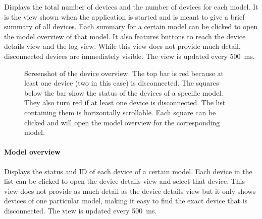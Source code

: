 Displays the total number of devices and the number of devices for each model. It is the view shown
when the application is started and is meant to give a brief summary of all devices. Each summary
for a certain model can be clicked to open the model overview of that model. It also features buttons
to reach the device details view and the log view. While this view does not provide much detail,
disconnected devices are immediately visible. The view is updated every \SI{500}{\milli\second}.

\begin{figure}[H]
    \centering
    \setlength{\fboxsep}{0mm}
    \caption[Screenshot of the device overview]{
        Screenshot of the device overview. The top bar is red because at least one device (two in
        this case) is disconnected. The squares below the bar show the status of the devices of a
        specific model. They also turn red if at least one device is disconnected. The list containing
        them is horizontally scrollable. Each square can be clicked and will open the model overview
        for the corresponding model.
    }
\end{figure}

\clearpage
\paragraph{Model overview}

Displays the status and ID of each device of a certain model. Each device in the list can be clicked
to open the device details view and select that device. This view does not provide as much detail as
the device details view but it only shows devices of one particular model, making it easy to find
the exact device that is disconnected. The view is updated every \SI{500}{\milli\second}.

